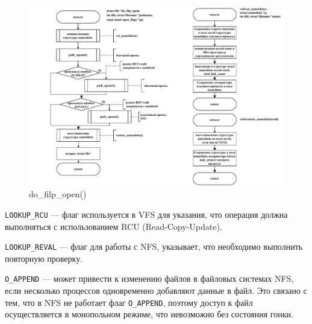 \clearpage

\begin{figure}[ht]
	\centering
	\includegraphics[width=\textwidth]{img/do_filp_open.pdf}
	\caption{do\_filp\_open()}
\end{figure}

\texttt{LOOKUP\_RCU} --- флаг используется в VFS для указания, что операция должна выполняться с использованием RCU (Read-Copy-Update).

\texttt{LOOKUP\_REVAL} --- флаг для работы с NFS, указывает, что необходимо выполнить повторную проверку.

\texttt{O\_APPEND} --- может привести к изменению файлов в файловых системах NFS, если несколько процессов одновременно добавляют данные в файл. Это связано с тем, что в NFS не работает флаг \texttt{O\_APPEND}, поэтому доступ к файл осуществляется в монопольном режиме, что невозможно без состояния гонки.

